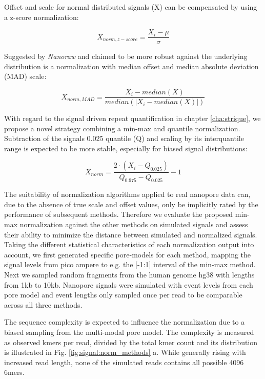 Offset and scale for normal distributed signals (X) can be compensated by using a z-score normalization:

\begin{equation}
	X_{norm,z-score} = \frac{X_{i} - \mu}{\sigma}
\end{equation}

Suggested by \textit{Nanoraw} and claimed \cite{Stoiber2017} to be more robust against the underlying distribution is a normalization with median offset and median absolute deviation (MAD) scale:

\begin{equation}
	X_{norm,MAD} = \frac{X_{i} - median(X)}{median(\left|X_{i}-median(X)\right|)}
\end{equation}

With regard to the signal driven repeat quantification in chapter \ref{cha:strique}, we propose a novel strategy combining a min-max and quantile normalization. Subtraction of the signals 0.025 quantile (Q) and scaling by its interquantile range is expected to be more stable, especially for biased signal distributions:

\begin{equation}
	X_{norm} = \frac{2 \cdot (X_{i} - Q_{0.025})}{Q_{0.975} - Q_{0.025}} - 1
\end{equation}

The suitability of normalization algorithms applied to real nanopore data can, due to the absence of true scale and offset values, only be implicitly rated by the performance of subsequent methods. 
Therefore we evaluate the proposed min-max normalization against the other methods on simulated signals and assess their ability to minimize the distance between simulated and normalized signals. 
Taking the different statistical characteristics of each normalization output into account, we first generated specific pore-models for each method, mapping the signal levels from pico ampere to e.g. the [-1:1] interval of the min-max method. 
Next we sampled random fragments from the human genome hg38 with lengths from 1kb to 10kb. Nanopore signals were simulated with event levels from each pore model and event lengths only sampled once per read to be comparable across all three methods. 

The sequence complexity is expected to influence the normalization due to a biased sampling from the multi-modal pore model. 
The complexity is measured as observed kmers per read, divided by the total kmer count and its distribution is illustrated in Fig. \ref{fig:signal:norm_methods} a. 
While generally rising with increased read length, none of the simulated reads contains all possible 4096 6mers.

